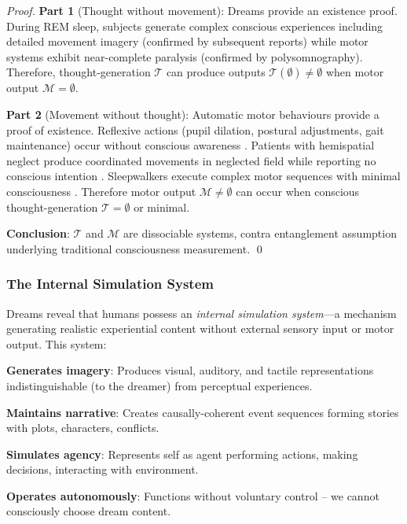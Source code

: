 \documentclass[11pt,onecolumn]{article}
\begin{document}
\begin{proof}
\textbf{Part 1} (Thought without movement): Dreams provide an existence proof. During REM sleep, subjects generate complex conscious experiences including detailed movement imagery (confirmed by subsequent reports) while motor systems exhibit near-complete paralysis (confirmed by polysomnography). Therefore, thought-generation $\mathcal{T}$ can produce outputs $\mathcal{T}(\emptyset) \neq \emptyset$ when motor output $\mathcal{M} = \emptyset$.

\textbf{Part 2} (Movement without thought): Automatic motor behaviours provide a proof of existence. Reflexive actions (pupil dilation, postural adjustments, gait maintenance) occur without conscious awareness \citep{dietz2002human}. Patients with hemispatial neglect produce coordinated movements in neglected field while reporting no conscious intention \citep{marshall2001spatial}. Sleepwalkers execute complex motor sequences with minimal consciousness \citep{zadra2013sleepwalking}. Therefore motor output $\mathcal{M} \neq \emptyset$ can occur when conscious thought-generation $\mathcal{T} = \emptyset$ or minimal.

\textbf{Conclusion}: $\mathcal{T}$ and $\mathcal{M}$ are dissociable systems, contra entanglement assumption underlying traditional consciousness measurement. \qed
\end{proof}

\subsubsection{The Internal Simulation System}

Dreams reveal that humans possess an \textit{internal simulation system}---a mechanism generating realistic experiential content without external sensory input or motor output. This system:

\textbf{Generates imagery}: Produces visual, auditory, and tactile representations indistinguishable (to the dreamer) from perceptual experiences.

\textbf{Maintains narrative}: Creates causally-coherent event sequences forming stories with plots, characters, conflicts.

\textbf{Simulates agency}: Represents self as agent performing actions, making decisions, interacting with environment.

\textbf{Operates autonomously}: Functions without voluntary control -- we cannot consciously choose dream content.
\end{document}
